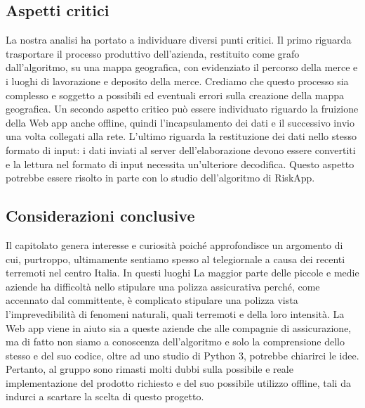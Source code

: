 \subsection{Aspetti critici}

La nostra analisi ha portato a individuare diversi punti critici. Il primo riguarda trasportare il processo produttivo dell’azienda, restituito come grafo dall’algoritmo, su una mappa geografica, con evidenziato il percorso della merce e i luoghi di lavorazione e deposito della merce. Crediamo che questo processo sia complesso e soggetto a possibili ed eventuali errori sulla creazione della mappa geografica. Un secondo aspetto critico può essere individuato riguardo la fruizione della Web app anche offline, quindi l'incapsulamento dei dati e il successivo invio una volta collegati alla rete. 
L'ultimo riguarda la restituzione dei dati nello stesso formato di input: i dati inviati al server dell'elaborazione devono essere convertiti e la lettura nel formato di input necessita un'ulteriore decodifica. Questo aspetto potrebbe essere risolto in parte con lo studio dell’algoritmo di RiskApp.

\subsection{Considerazioni conclusive}

Il capitolato genera interesse e curiosità poiché approfondisce un argomento di cui, purtroppo, ultimamente sentiamo spesso al telegiornale a causa dei recenti terremoti nel centro Italia. In questi luoghi La maggior parte delle piccole e medie aziende ha difficoltà nello stipulare una polizza assicurativa perché, come accennato dal committente, è complicato stipulare una polizza
vista l'imprevedibilità di fenomeni naturali, quali terremoti e della loro intensità. La Web app viene in aiuto sia a queste aziende che alle compagnie di assicurazione, ma di fatto non siamo a conoscenza dell'algoritmo e solo la comprensione dello stesso e del suo codice, oltre ad uno studio di Python 3, potrebbe chiarirci le idee. Pertanto, al gruppo sono rimasti molti dubbi sulla possibile e reale implementazione del prodotto richiesto e del suo possibile utilizzo offline, tali da indurci a scartare la scelta di questo progetto.
